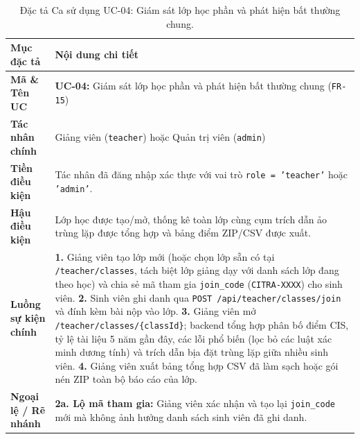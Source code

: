 \begin{table}[!htbp]
\centering
\caption{Đặc tả Ca sử dụng UC-04: Giám sát lớp học phần và phát hiện bất thường chung.}\label{tab:uc04}
\begin{tabular}{|L{0.24}|L{0.76}|}
\hline
\textbf{Mục đặc tả} & \textbf{Nội dung chi tiết} \\
\hline
\textbf{Mã \& Tên UC} & \textbf{UC-04:} Giám sát lớp học phần và phát hiện bất thường chung (\texttt{FR-15}) \\
\hline
\textbf{Tác nhân chính} & Giảng viên (\texttt{teacher}) hoặc Quản trị viên (\texttt{admin}) \\
\hline
\textbf{Tiền điều kiện} & Tác nhân đã đăng nhập xác thực với vai trò \texttt{role = 'teacher'} hoặc \texttt{'admin'}. \\
\hline
\textbf{Hậu điều kiện} & Lớp học được tạo/mở, thống kê toàn lớp cùng cụm trích dẫn ảo trùng lặp được tổng hợp và bảng điểm ZIP/CSV được xuất. \\
\hline
\textbf{Luồng sự kiện chính} & \textbf{1.} Giảng viên tạo lớp mới (hoặc chọn lớp sẵn có tại \texttt{/teacher/classes}, tách biệt lớp giảng dạy với danh sách lớp đang theo học) và chia sẻ mã tham gia \texttt{join\_code} (\texttt{CITRA-XXXX}) cho sinh viên. \newline \textbf{2.} Sinh viên ghi danh qua \texttt{POST /api/teacher/classes/join} và đính kèm bài nộp vào lớp. \newline \textbf{3.} Giảng viên mở \texttt{/teacher/classes/\{classId\}}; backend tổng hợp phân bố điểm CIS, tỷ lệ tài liệu 5 năm gần đây, các lỗi phổ biến (lọc bỏ các luật xác minh dương tính) và trích dẫn bịa đặt trùng lặp giữa nhiều sinh viên. \newline \textbf{4.} Giảng viên xuất bảng tổng hợp CSV đã làm sạch hoặc gói nén ZIP toàn bộ báo cáo của lớp. \\
\hline
\textbf{Ngoại lệ / Rẽ nhánh} & \textbf{2a. Lộ mã tham gia:} Giảng viên xác nhận và tạo lại \texttt{join\_code} mới mà không ảnh hưởng danh sách sinh viên đã ghi danh. \\
\hline
\end{tabular}
\end{table}

